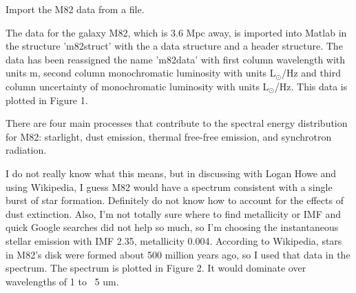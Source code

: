 \documentclass[10pt,letterpaper]{hmcpset}
\begin{document}
	
	\begin{problem}[Problem 1]
		
		Import the M82 data from a file.
		
	\end{problem}

	\begin{solution}
		
		The data for the galaxy M82, which is 3.6 Mpc away, is imported into Matlab in the structure 'm82struct' with the a data structure and a header structure. The data has been reassigned the name 'm82data' with first column wavelength with units {\textmu}m, second column monochromatic luminosity with units L$_\odot$/Hz and third column uncertainty of monochromatic luminosity with units L$_\odot$/Hz. This data is plotted in Figure 1.
	
	\end{solution}

	\begin{problem}[Problem 2]
		
	There are four main processes that contribute to the spectral energy distribution for M82: starlight, dust emission, thermal free-free emission, and synchrotron radiation.

	\end{problem}

	
	\begin{problem}[Problem 2a]
	
	\end{problem}

	\begin{solution}
		
		I do not really know what this means, but in discussing with Logan Howe and using Wikipedia, I guess M82 would have a spectrum consistent with a single burst of star formation. Definitely do not know how to account for the effects of dust extinction. Also, I'm not totally sure where to find metallicity or IMF and quick Google searches did not help so much, so I'm choosing the instantaneous stellar emission with IMF 2.35, metallicity 0.004. According to Wikipedia, stars in M82's disk were formed about 500 million years ago, so I used that data in the spectrum. The spectrum is plotted in Figure 2. It would dominate over wavelengths of 1 to ~5 um.
		
	\end{solution}

	\begin{problem}[Problem 2b]
	
	\end{problem}
	
\end{document}
